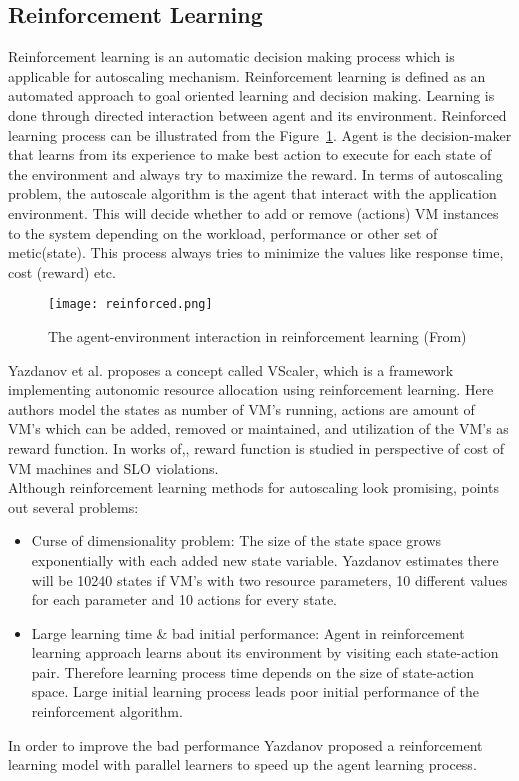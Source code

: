 \subsection{Reinforcement Learning}
\label{sub:Reinforcement Learning}
Reinforcement learning is an automatic decision making process which is applicable for autoscaling mechanism\cite{lorido2012auto}. Reinforcement learning\cite{Reinforced} is defined as an automated approach to goal oriented learning and decision making. Learning is done through directed interaction between agent and its environment. Reinforced learning process can be illustrated from the Figure~\ref{figure:reinforced}. Agent is the  decision-maker that learns from its experience to make best action to execute for each state of the environment and always try to maximize the reward\cite{Reinforced}. In terms of autoscaling problem, the autoscale algorithm is the agent that interact with the application environment. This will decide whether to add or remove (actions) VM instances to the system depending on the workload, performance or other set of metic(state). This process always tries to minimize the values like response time, cost (reward) etc.
\begin{figure}[h]
  \begin{center}
    \texttt{[image: reinforced.png]}
    \caption{The agent-environment interaction in reinforcement learning (From\cite{Reinforced})}
    \label{figure:reinforced}
  \end{center}
\end{figure}
Yazdanov et al.\cite{yazdanov2013vscaler} proposes a concept called VScaler, which is a framework implementing autonomic resource allocation using reinforcement learning. Here authors model the  states as number of VM's running, actions are amount of VM's which can be added, removed or maintained\cite{yazdanov2013vscaler}, and utilization of the VM's as reward function. In works of\cite{barrett2013applying},\cite{dutreilh2011using},\cite{rao2009vconf} reward function is studied in perspective of cost of VM machines and  SLO violations.
\\
Although reinforcement learning methods for autoscaling look promising,\cite{lorido2012auto} points out several problems:
\begin{itemize}
  \item Curse of dimensionality problem\cite{yazdanov2013vscaler}: The size of the state space grows  exponentially with each added new state variable. Yazdanov\cite{yazdanov2013vscaler} estimates there will be 10240 states if VM's with two resource parameters, 10 different values for each parameter and 10 actions for every state.
  \item Large learning time \& bad initial performance: Agent in reinforcement learning approach learns about its environment by visiting each state-action pair. Therefore learning process time depends on the size of state-action space. Large initial learning process leads poor initial performance of the reinforcement algorithm.
\end{itemize}
In order to improve the bad performance Yazdanov\cite{yazdanov2013vscaler} proposed a reinforcement learning model with parallel learners to speed up the agent learning process.
